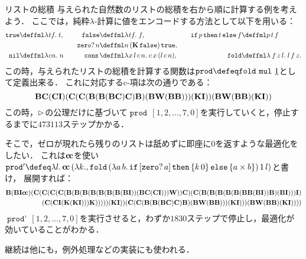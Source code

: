 \documentclass[realisability.tex]{subfiles}
\begin{document}
\begin{example}{リストの総積}
 与えられた自然数のリストの総積を右から順に計算する例を考えよう．
 ここでは，純粋$\lambda$-計算に値をエンコードする方法として以下を用いる：
 \begin{alignat*}{3}
  \mathtt{true}   &\deffml \abs{t f}{t},\quad&
  \mathtt{false}  &\deffml \abs{t f}{f},\quad&
  \mathtt{if}\, p\, \mathtt{then}\, t\, \mathtt{else}\, f &\deffml p \,t\,f
  \\
  &&\mathtt{zero?}\,n &\deffml n\, (\K\,\mathtt{false})\, \mathtt{true},\quad &
  \\
  \mathtt{nil} &\deffml \abs{c n}{n} \quad&
  \mathtt{cons}\,&\deffml \abs{x\, l\, c\, n}{c\, x\, (l\, c\, n)},\quad&
  \mathtt{fold} & \deffml \abs{\,f\,z\,l}{l\, f \, z.}
 \end{alignat*}
 この時，与えられたリストの総積を計算する関数は$\mathtt{prod} \defeq \texttt{fold}\, \prog{mul}\, \underline{1}$として定義出来る．
 これに対応する\textsf{c}-項は次の通りである：
 \[
  \B \C (\C \I) (\C (\C (\B (\B (\B \C) \C) \B) (\B \W (\B \B))) (\K \I)) (\B \W (\B \B) (\K \I))
 \]
 この時，$\reds$の公理だけに基づいて$\mathop{\mathtt{prod}}\,[1,2, \dots, 7, 0]$を実行していくと，停止するまでに$473113$ステップかかる\footnotemark．

 そこで，ゼロが現れたら残りのリストは舐めずに即座に$0$を返すような最適化をしたい．
 これは$\cc$を使い$\mathtt{prod}' \defeq \lambda l.\, \cc\,(\lambda k., \mathtt{fold}\,(\lambda a\,b.\, \mathtt{if}\,[\mathtt{zero?}\,a]\,\mathtt{then}\, \{k\,0\}\, \mathtt{else}\, \{a \times b\})\,1\,l)$と書け，
 展開すれば：
 \begin{align*}
  \B (\B \I \cc) (\C (\C (\C (\C (\B (\B (\B (\B (\B (\B (\B (\B \I)) (\B \C (\C \I))) \W)) \C) (\C (\B (\B (\B (\B (\B (\B \B (\B \I)) \B) (\B \I))) \I)\\ (\C (\C \I (\K (\K \I))) \K))))) (\K \I)) (\C (\C (\B (\B (\B \C) \C) \B) (\B \W (\B \B))) (\K \I))) (\B \W (\B \B) (\K \I))))
 \end{align*}
 $\mathop{\mathtt{prod}'}\,[1,2, \dots, 7, 0]$を実行させると，わずか$1830$ステップで停止し，最適化が効いていることがわかる．

 継続は他にも，例外処理などの実装にも使われる．
\end{example}
\end{document}
